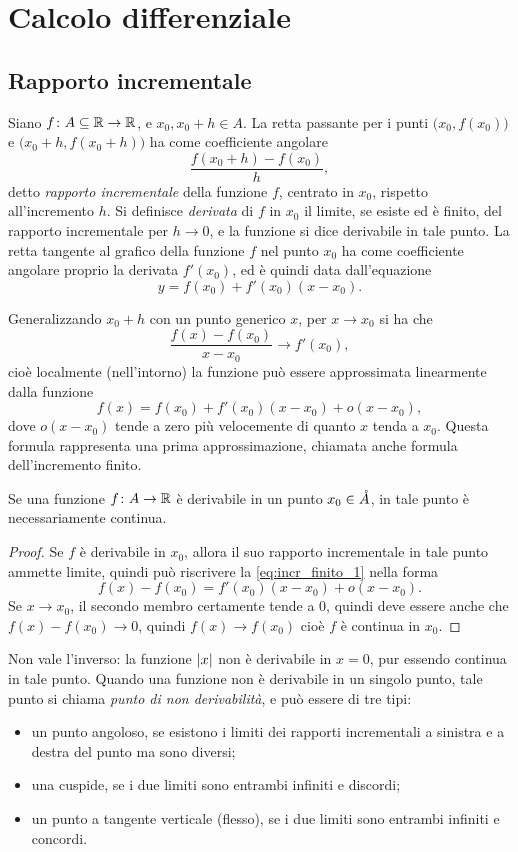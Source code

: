 \chapter{Calcolo differenziale}
\section{Rapporto incrementale}
Siano $f\colon A\subseteq\mathbb{R}\to\mathbb{R}$,  e $x_0,x_0+h\in A$. La retta passante per i punti $\big(x_0,f(x_0)\big)$ e $(x_0+h,f(x_0+h)\big)$ ha come coefficiente angolare
\begin{equation}
\label{eq:rapporto_incr}
\frac{f(x_0+h)-f(x_0)}{h},
\end{equation}
detto \emph{rapporto incrementale} della funzione $f$, centrato in $x_0$, rispetto all'incremento $h$.
Si definisce \emph{derivata} di $f$ in $x_0$ il limite, se esiste ed è finito, del rapporto incrementale per $h\to 0$, e la funzione si dice derivabile in tale punto. La retta tangente al grafico della funzione $f$ nel punto $x_0$ ha come coefficiente angolare proprio la derivata $f'(x_0)$, ed è quindi data dall'equazione
\begin{equation}
y=f(x_0)+f'(x_0)(x-x_0).
\end{equation}

Generalizzando $x_0+h$ con un punto generico $x$, per $x\to x_0$ si ha che
\[
\frac{f(x)-f(x_0)}{x-x_0}\to f'(x_0),
\]
cioè localmente (nell'intorno) la funzione può essere approssimata linearmente dalla funzione
\begin{equation}
\label{eq:incr_finito_1}
f(x)=f(x_0)+f'(x_0)(x-x_0)+o(x-x_0),
\end{equation}
dove $o(x-x_0)$ tende a zero più velocemente di quanto $x$ tenda a $x_0$. Questa formula rappresenta una prima approssimazione, chiamata anche formula dell'incremento finito.
\begin{teorema}
Se una funzione $f\colon A\to\mathbb{R}$ è derivabile in un punto $x_0\in\mathring{A}$, in tale punto è necessariamente continua.
\end{teorema}
\begin{proof}
Se $f$ è derivabile in $x_0$, allora il suo rapporto incrementale in tale punto ammette limite, quindi può riscrivere la \eqref{eq:incr_finito_1} nella forma
\[
f(x)-f(x_0)=f'(x_0)(x-x_0)+o(x-x_0).
\]
Se $x\to x_0$, il secondo membro certamente tende a 0, quindi deve essere anche che $f(x)-f(x_0)\to0$, quindi $f(x)\to f(x_0)$ cioè $f$ è continua in $x_0$.
\end{proof}
Non vale l'inverso: la funzione $\lvert x\rvert$ non è derivabile in $x=0$, pur essendo continua in tale punto.
Quando una funzione non è derivabile in un singolo punto, tale punto si chiama \emph{punto di non derivabilità}, e può essere di tre tipi:
\begin{itemize}
\item un punto angoloso, se esistono i limiti dei rapporti incrementali a sinistra e a destra del punto ma sono diversi;
\item una cuspide, se i due limiti sono entrambi infiniti e discordi;
\item un punto a tangente verticale (flesso), se i due limiti sono entrambi infiniti e concordi.
\end{itemize}
